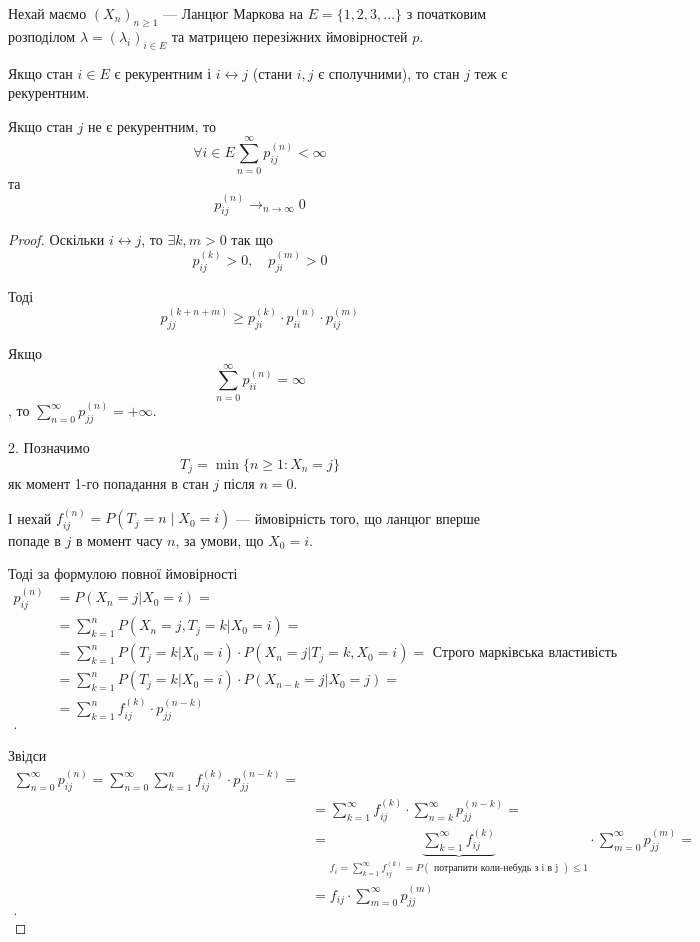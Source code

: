 
Нехай маємо $\left( X_n \right) _{n\geq 1}$ --- Ланцюг Маркова на $E=\{1, 2, 3, \ldots\} $ 
з початковим розподілом $\lambda = \left( \lambda _i \right) _{i \in E}$ та матрицею
перезіжних ймовірностей $p$.

\begin{theorem}
  Якщо стан $i \in E$ є рекурентним і $i \leftrightarrow j$ (стани $i, j$ є сполучними), то стан
  $j$ теж є рекурентним.

  Якщо стан $j$ не є рекурентним, то \[ 
  \forall i \in  E \sum_{n=0}^{\infty} p^{(n)}_{ij} < \infty \] 
  та
  \[ p^{(n)}_{ij} \to_{n \to  \infty}  0 \] 
\end{theorem}

\begin{proof}
  Оскільки $i \leftrightarrow j$, то $\exists k, m > 0$ так що
  \[ p^{(k)}_{ij}>0, \quad p^{(m)}_{ji}>0 \] 

  Тоді \[ p^{(k + n + m)}_{jj} \geq p^{(k)}_{ji}\cdot p^{(n)}_{ii}\cdot p^{(m)}_{ij} \] 

  Якщо \[ \sum_{n=0}^{\infty} p^{(n)}_{ii} = \infty \] , то $\sum_{n=0}^{\infty} p^{(n)}_{jj} = +\infty$.

  2. Позначимо \[ T_{j} = \min \{ n\geq 1 : X_n = j \}  \] 
  як момент 1-го попадання в стан $j$ після $n=0$.
  
  І нехай $f^{(n)}_{ij} = P\left( T_j = n \mid X_0 = i \right) $ --- ймовірність того, що ланцюг вперше 
  попаде в $j$ в момент часу $n$, за умови, що $X_0 = i$.

  Тоді за формулою повної ймовірності
  \begin{align*}
    p^{(n)}_{ij} &= P\left( X_n = j | X_0 = i \right) = \\
    &= \sum_{k=1}^{n} P\left( X_n = j, T_j = k | X_0 = i \right) = \\
    &= \sum_{k=1}^{n} P\left( T_j = k | X_0=i \right) \cdot P\left( X_n=j|T_j=k,X_0=i\right) = 
    \text{ Строго марківська властивість }\\
    &= \sum_{k=1}^{n} P\left( T_j=k | X_0=i \right) \cdot P\left( X_{n-k}=j|X_0=j \right) = \\
    &= \sum_{k=1}^{n} f^{(k)}_{ij}\cdot p^{(n-k)}_{jj} \\
  .\end{align*}

  Звідси 
  \begin{align*}
    \sum_{n=0}^{\infty} p^{(n)}_{ij} = \sum_{n=0}^{\infty} \sum_{k=1}^{n} f^{(k)}_{ij} \cdot p^{(n-k)}_{jj} = \\
    &= \sum_{k=1}^{\infty} f^{(k)}_{ij}\cdot \sum_{n=k}^{\infty} p^{(n-k)}_{jj} = \\
    &= \underbrace{\sum_{k=1}^{\infty} f^{(k)}_{ij}}_{f_{i} = \sum_{k=1}^{\infty} f^{(k)}_{ij}=
        P\left( \text{ потрапити коли-небудь з i в j } \right) \leq 1}
      \cdot \sum_{m=0}^{\infty} p^{(m)}_{jj} = \\
    &= f_{ij} \cdot \sum_{m=0}^{\infty} p^{(m)}_{jj} \\
  .\end{align*}


\end{proof}
